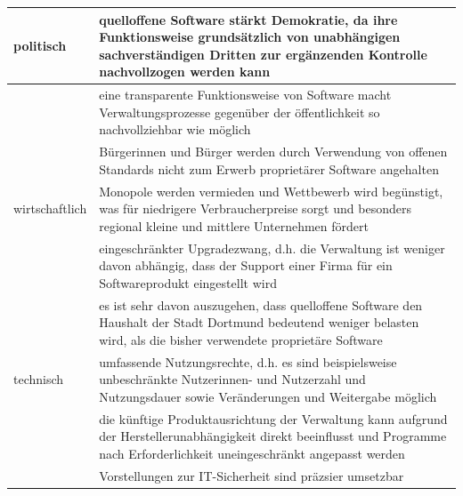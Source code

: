 \documentclass[a4paper]{scrartcl}
\begin{document}
\begin{center}

\begin{supertabular}{|m{0.9844598in}m{4.76776in}|}
\hline
politisch &

quelloffene Software stärkt Demokratie, da ihre Funktionsweise grundsätzlich von
unabhängigen sachverständigen Dritten zur ergänzenden Kontrolle nachvollzogen
werden kann\\

\hline
&

eine transparente Funktionsweise von Software macht Verwaltungsprozesse
gegenüber der öffentlichkeit so nachvollziehbar wie möglich\\

\hline

&

Bürgerinnen und Bürger werden durch Verwendung von offenen Standards nicht zum
Erwerb proprietärer Software angehalten\\

\hline

wirtschaftlich &

Monopole werden vermieden und Wettbewerb wird begünstigt, was für niedrigere
Verbraucherpreise sorgt und besonders regional kleine und mittlere Unternehmen
fördert\\

\hline

&

eingeschränkter Upgradezwang, d.h. die Verwaltung ist weniger davon abhängig,
dass der Support einer Firma für ein Softwareprodukt eingestellt
wird\\

\hline


&

es ist sehr davon auszugehen, dass quelloffene Software den Haushalt der Stadt
Dortmund bedeutend weniger belasten wird, als die bisher verwendete proprietäre
Software\\

\hline

technisch &

umfassende Nutzungsrechte, d.h. es sind beispielsweise unbeschränkte
Nutzerinnen- und Nutzerzahl und Nutzungsdauer sowie Veränderungen und Weitergabe
möglich\\

\hline

&

die künftige Produktausrichtung der Verwaltung kann aufgrund der
Herstellerunabhängigkeit direkt beeinflusst und Programme nach Erforderlichkeit
uneingeschränkt
angepasst werden\\

\hline


&

Vorstellungen zur IT-Sicherheit sind präzsier umsetzbar\\

\hline
\end{supertabular}
\end{center}
\end{document}
